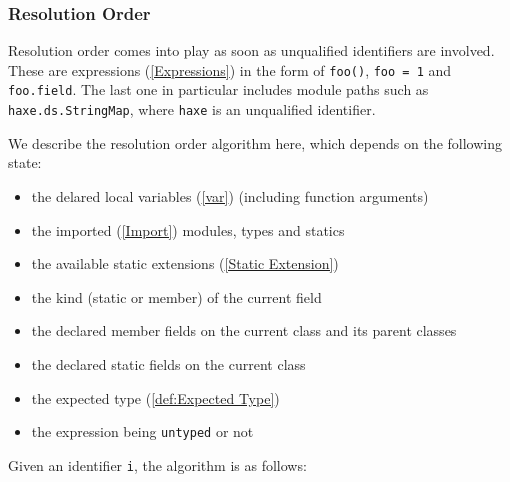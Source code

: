 \documentclass{article}
\newcommand{\expr}[1]{\texttt{#1}}
\newcommand{\tref}[2]{#1 (\ref{#2})}
\begin{document}
\subsubsection{Resolution Order}
\label{Resolution Order}

Resolution order comes into play as soon as unqualified identifiers are involved. These are \tref{expressions}{Expressions} in the form of \expr{foo()}, \expr{foo = 1} and \expr{foo.field}. The last one in particular includes module paths such as \expr{haxe.ds.StringMap}, where \expr{haxe} is an unqualified identifier.  

We describe the resolution order algorithm here, which depends on the following state:

\begin{itemize}
	\item the delared \tref{local variables}{var} (including function arguments)
	\item the \tref{imported}{Import} modules, types and statics
	\item the available \tref{static extensions}{Static Extension}
	\item the kind (static or member) of the current field
	\item the declared member fields on the current class and its parent classes
	\item the declared static fields on the current class
	\item the \tref{expected type}{def:Expected Type}
	\item the expression being \expr{untyped} or not
\end{itemize}

Given an identifier \expr{i}, the algorithm is as follows:
\end{document}

